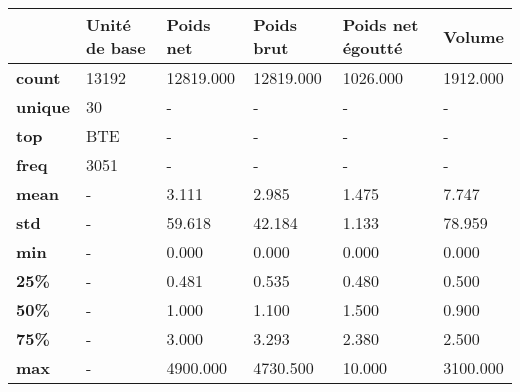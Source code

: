 \begin{tabularx}{\linewidth}{lXXXXX}
\toprule
{} & Unité de base &  Poids net &  Poids brut &  Poids net égoutté &    Volume \\
\midrule
\textbf{count } &         13192 &  12819.000 &   12819.000 &           1026.000 &  1912.000 \\
\textbf{unique} &            30 &          - &           - &                  - &         - \\
\textbf{top   } &           BTE &          - &           - &                  - &         - \\
\textbf{freq  } &          3051 &          - &           - &                  - &         - \\
\textbf{mean  } &             - &      3.111 &       2.985 &              1.475 &     7.747 \\
\textbf{std   } &             - &     59.618 &      42.184 &              1.133 &    78.959 \\
\textbf{min   } &             - &      0.000 &       0.000 &              0.000 &     0.000 \\
\textbf{25\%   } &             - &      0.481 &       0.535 &              0.480 &     0.500 \\
\textbf{50\%   } &             - &      1.000 &       1.100 &              1.500 &     0.900 \\
\textbf{75\%   } &             - &      3.000 &       3.293 &              2.380 &     2.500 \\
\textbf{max   } &             - &   4900.000 &    4730.500 &             10.000 &  3100.000 \\
\bottomrule
\end{tabularx}
